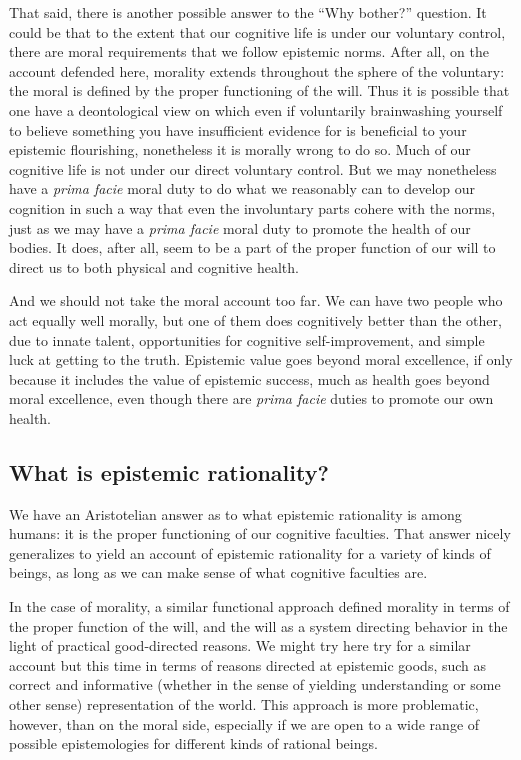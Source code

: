 That said, there is another possible answer to the ``Why bother?'' question. It could be that to the extent
that our cognitive life is under our voluntary control, there are moral requirements that we follow epistemic
norms. After all, on the account defended here, morality extends throughout the sphere of the voluntary: 
the moral is defined by the proper functioning of the will. Thus it is possible that one have a deontological
view on which even if voluntarily brainwashing yourself to believe something you have insufficient evidence 
for is beneficial to your epistemic flourishing, nonetheless it is morally wrong to do so. 
Much of our cognitive life is not under our direct voluntary control. But we may nonetheless have a 
\textit{prima facie} moral duty  to do what we reasonably can to develop our cognition in such a way that even the 
involuntary parts cohere with the norms, just as we may have a \textit{prima facie} moral duty to promote the 
health of our bodies. It does, after all, seem to be a part of the proper function of our will to direct us to 
both physical and cognitive health.

And we should not take the moral account too far. We can have two people who act equally well morally, but one 
of them does cognitively better than the other, due to innate talent, opportunities for cognitive self-improvement,
and simple luck at getting to the truth. Epistemic value goes beyond moral excellence, if only because it includes 
the value of epistemic success, much as health goes beyond moral excellence, even though there are \textit{prima 
facie} duties to promote our own health.

\subsection{What is epistemic rationality?}
We have an Aristotelian answer as to what epistemic rationality is among humans: it is the proper functioning of 
our cognitive faculties. That answer nicely generalizes to yield an account of epistemic rationality for a variety 
of kinds of beings, as long as we can make sense of what cognitive faculties are. 

In the case of morality, a similar functional approach defined morality in terms of the proper function of the will,
and the will as a system directing behavior in the light of practical good-directed reasons. We might try here try for 
a similar account but this time in terms of reasons directed at epistemic goods, such as correct and informative 
(whether in the sense of yielding understanding or some other sense) representation of the world.
This approach is more problematic, however, than on the moral side, especially if we are open to a wide range of 
possible epistemologies for different kinds of rational beings.

